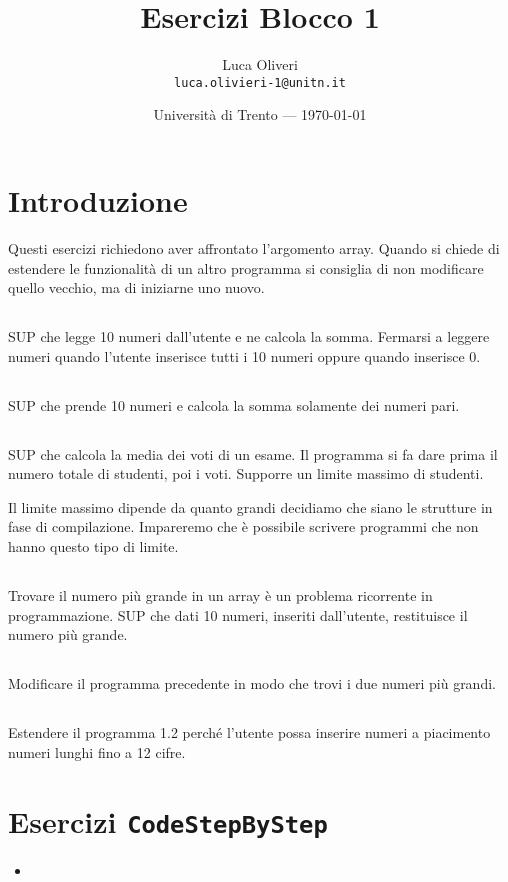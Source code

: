 \documentclass{article}
\title{Esercizi Blocco 1} %
\author{Luca Oliveri\\ \texttt{luca.olivieri-1@unitn.it}} %
\date{Università di Trento --- \today} %
\begin{document}
\maketitle %

\section*{Introduzione} %
Questi esercizi richiedono aver affrontato l'argomento array. Quando si chiede di estendere le funzionalità di un altro programma si consiglia di non modificare quello vecchio, ma di iniziarne uno nuovo.

\setcounter{section}{2}


\subsection{}
SUP che legge 10 numeri dall'utente e ne calcola la somma. Fermarsi a leggere numeri quando l'utente inserisce tutti i 10 numeri oppure quando inserisce 0.

\subsection{}
SUP che prende 10 numeri e calcola la somma solamente dei numeri pari.

\subsection{}
SUP che calcola la media dei voti di un esame. Il programma si fa dare prima il numero totale di studenti, poi i voti. Supporre un limite massimo di studenti. 

\begin{info} 
	Il limite massimo dipende da quanto grandi decidiamo che siano le strutture in fase di compilazione. Impareremo che è possibile scrivere programmi che non hanno questo tipo di limite.
\end{info}

\subsection{}
Trovare il numero più grande in un array è un problema ricorrente in programmazione. SUP che dati 10 numeri, inseriti dall'utente, restituisce il numero più grande.

\subsection{}
Modificare il programma precedente in modo che trovi i due numeri più grandi.

\subsection{}
Estendere il programma 1.2 perché l'utente possa inserire numeri a piacimento numeri lunghi fino a 12 cifre.






\section*{Esercizi \texttt{CodeStepByStep}}
\begin{itemize}
	\item 
\end{itemize}
\end{document}
